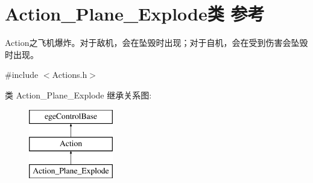 \hypertarget{class_action___plane___explode}{}\section{Action\+\_\+\+Plane\+\_\+\+Explode类 参考}
\label{class_action___plane___explode}


Action之飞机爆炸。对于敌机，会在坠毁时出现；对于自机，会在受到伤害会坠毁时出现。  




{\ttfamily \#include $<$Actions.\+h$>$}

类 Action\+\_\+\+Plane\+\_\+\+Explode 继承关系图\+:\begin{figure}[H]
\begin{center}
\leavevmode
\includegraphics[height=3.000000cm]{class_action___plane___explode}
\end{center}
\end{figure}
